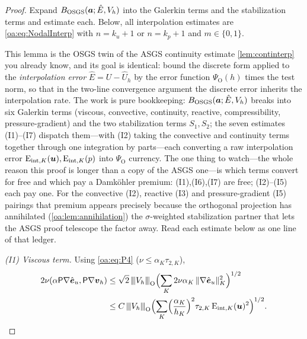 \begin{proof}
Expand $B_{\mathrm{OSGS}}(\boldsymbol{a}; \hat E, V_h)$ into the Galerkin terms and the
stabilization terms and estimate each. Below, all interpolation estimates are
\cref{oa:eq:NodalInterp} with $n = k_u+1$ or $n = k_p+1$ and $m \in \{0,1\}$.

\begin{pedagogy}
This lemma is the OSGS twin of the ASGS continuity estimate
\cref{lem:continterp} you already know, and its goal is identical: bound the
discrete form applied to the \emph{interpolation error} $\hat E = U - \hat U_h$
by the error function $\Psi_{\mathrm O}(h)$ times the test norm, so that in the
two-line convergence argument the discrete error inherits the interpolation
rate. The work is pure bookkeeping: $B_{\mathrm{OSGS}}(\boldsymbol{a};\hat E,V_h)$ breaks
into six Galerkin terms (viscous, convective, continuity, reactive,
compressibility, pressure-gradient) and the two stabilization terms $S_1,S_2$;
the seven estimates (I1)--(I7) dispatch them---with (I2) taking the convective
and continuity terms together through one integration by parts---each converting
a raw interpolation error $\mathrm{E}_{\mathrm{int},K}(\boldsymbol{u}),\mathrm{E}_{\mathrm{int},K}(p)$ into $\Psi_{\mathrm O}$
currency. The one thing to watch---the whole reason this proof is longer than a
copy of the ASGS one---is which terms convert for free and which pay a
Damk\"ohler premium: (I1),(I6),(I7) are free; (I2)--(I5) each pay one. For the
convective (I2), reactive (I3) and pressure-gradient (I5) pairings that premium
appears precisely because the orthogonal projection has annihilated
(\cref{oa:lem:annihilation}) the $\sigma$-weighted stabilization partner that
lets the ASGS proof telescope the factor away. Read each estimate below as one
line of that ledger.
\end{pedagogy}

\smallskip\noindent
\emph{(I1) Viscous term.} Using \cref{oa:eq:P4} ($\nu \le \alpha_K\tau_{2,K}$),
\begin{align*}
  2\nu(\alpha\mathsf{P}\nabla\hat{\boldsymbol e}_u, \mathsf{P}\nabla\boldsymbol{v}_h)
  &\le \sqrt{2}\,{\lvert\kern-0.25ex\lvert\kern-0.25ex\lvert V_h \rvert\kern-0.25ex\rvert\kern-0.25ex\rvert}_{\mathrm{O}}\Bigl( \sum_K 2\nu\alpha_K\,
  \lVert \nabla\hat{\boldsymbol e}_u \rVert_K^2 \Bigr)^{1/2}\\
  &\le C\,{\lvert\kern-0.25ex\lvert\kern-0.25ex\lvert V_h \rvert\kern-0.25ex\rvert\kern-0.25ex\rvert}_{\mathrm{O}}\Bigl( \sum_K
  \Bigl(\frac{\alpha_K}{h_K}\Bigr)^2\tau_{2,K}\,\mathrm{E}_{\mathrm{int},K}(\boldsymbol{u})^2 \Bigr)^{1/2}.
\end{align*}


\end{proof}
